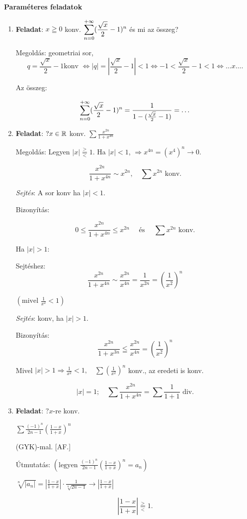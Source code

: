 \documentclass[a4paper,11.5pt]{article}
\begin{document}
	\textbf{Paraméteres feladatok}
	\begin{enumerate}
	\item \textbf{Feladat}: $x\geqq0$ konv. $\displaystyle\sum_{n=0}^{+\infty}(\frac{\sqrt{x}}{2}-1)^n$ és mi az összeg?
	
	Megoldás: geometriai sor, \[q=\displaystyle\frac{\sqrt{x}}{2}-1\text{
	konv }\Leftrightarrow |q|=|\displaystyle\frac{\sqrt{x}}{2}-1|<1 \Leftrightarrow -1<\frac{\sqrt{x}}{2}-1<1 \Leftrightarrow \ldots x\ldots.\]
	
	Az összeg:
	
	\[\sum_{n=0}^{+\infty} (\frac{\sqrt{x}}{2}-1)^n=\frac{1}{1-(\frac{\sqrt{x}}{2}-1)}=\ldots\]
	
	\bigskip
	\item \textbf{Feladat}: $? x\in \mathbb{R}$ konv. $\displaystyle\sum \frac{x^{2n}}{1+x^{4n}}$
	
	\medskip
	Megoldás: Legyen $\displaystyle|x|\overset{>}{\underset{<}{=}}1$. \quad Ha $|x|<1$, \quad $\Rightarrow x^{4n}=(x^4)^n \longrightarrow 0.$
	
	\[\frac{x^{2n}}{1+x^{4n}}\sim x^{2n}, \quad  \sum x^{2n}\text{ konv.}\]
	
	\medskip
	\textit{Sejtés}: A sor konv ha $|x|<1.$
	
	Bizonyítás: 
	
	\[0\leq \frac{x^{2n}}{1+x^{4n}}\leq x^{2n}\quad\text{ és }\quad\sum x^{2n}\text{ konv.}\]
	
	\medskip Ha $|x|>1:$
	
	Sejtéshez: \[\frac{x^{2n}}{1+x^{4n}}\sim  \frac{x^{2n}}{x^{4n}}=\frac{1}{x^{2n}}=(\frac{1}{x^2})^n\]
	
	$\left(\text{mivel }\displaystyle\frac{1}{x^2}<1 \right)$
	
	\medskip
	\textit{Sejtés}: konv, ha $|x|>1$.
	
	Bizonyítás: \[\frac{x^{2n}}{1+x^{3n}}\leqq\frac{x^{2n}}{x^{4n}}= (\frac{1}{x^2})^n\]
	
	Mivel $|x|>1 \Rightarrow\displaystyle \frac{1}{x^2}<1, \quad \sum (\frac{1}{x^2})^n$ konv., az eredeti is konv.
	
	\[|x|=1; \quad \sum \frac{x^{2n}}{1+x^{4n}}= \sum\frac{1}{1+1}\text{ div.}\]
	
	\bigskip
	\item \textbf{Feladat}: $? x$-re konv.
	\begin{center}
		
	$\displaystyle\sum\frac{(-1)^n}{2n-1}(\frac{1-x}{1+x})^n$
	
	\end{center}
	\medskip (GYK)-mal. [AF.]
	
	Útmutatás: $\left(\text{legyen }\displaystyle\frac{(-1)^n}{2n-1}\left(\frac{1-x}{1+x}\right)^n = a_n\right)$ 
	\begin{center}
		
	$\displaystyle\sqrt[n]{|a_n|}=\left|\frac{1-x}{1+x}\right|\cdot\frac{1}{\sqrt[n]{2n-1}}\longrightarrow \left|\frac{1-x}{1+x}\right|$
	
	\end{center}
	\medskip
	\[\left|\frac{1-x}{1+x}\right|\overset{>}{\underset{<}{=}}1.\]
	
\end{enumerate}
	
\end{document}
